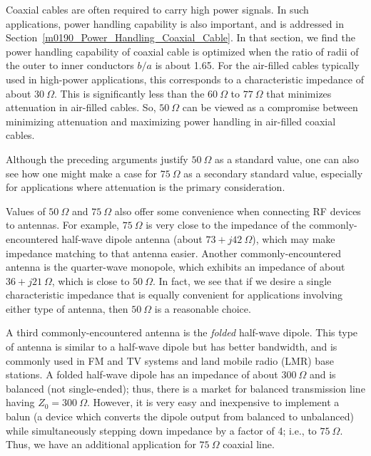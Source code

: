 Coaxial cables are often required to carry high power signals.  In such applications, power handling
capability is also important, and is addressed in Section~\ref{m0190_Power_Handling_Coaxial_Cable}.
In that section, we find the power handling capability of coaxial cable is optimized when the ratio of radii of the outer to inner conductors $b/a$ is about 1.65.  
For the air-filled cables typically used in high-power applications, this corresponds to a characteristic impedance of about $30~\Omega$.
This is significantly less than the $60~\Omega$ to $77~\Omega$ that minimizes attenuation in air-filled cables.
So, $50~\Omega$ can be viewed as a compromise between minimizing attenuation and maximizing power handling in air-filled coaxial cables. 

Although the preceding arguments justify $50~\Omega$ as a standard value, one can also see how one might make a case for $75~\Omega$ as a secondary standard value, especially for applications where attenuation is the primary consideration.  

Values of $50~\Omega$ and $75~\Omega$ also offer some convenience when connecting RF devices to antennas.  
For example, $75~\Omega$ is very close to the impedance of the commonly-encountered half-wave dipole antenna 
(about $73+j42~\Omega$), which may make impedance matching to that antenna easier. 
Another commonly-encountered antenna is the quarter-wave monopole, 
which exhibits an impedance of about $36+j21~\Omega$, which is close to $50~\Omega$.
In fact, we see that if we desire a single characteristic impedance that is equally convenient for applications involving either type of antenna, then $50~\Omega$ is a reasonable choice.

A third commonly-encountered antenna is the \emph{folded} half-wave dipole.  
This type of antenna is similar to a half-wave dipole but has better bandwidth, and is commonly used in FM and TV systems and land mobile radio (LMR) base stations.
A folded half-wave dipole has an impedance of about $300~\Omega$ and is balanced (not single-ended); 
thus, there is a market for balanced transmission line having $Z_0=300~\Omega$.  
However, it is very easy and inexpensive to implement a balun 
(a device which converts the dipole output from balanced to unbalanced) while simultaneously stepping down impedance by a factor of 4; i.e., to $75~\Omega$.
Thus, we have an additional application for $75~\Omega$ coaxial line.

